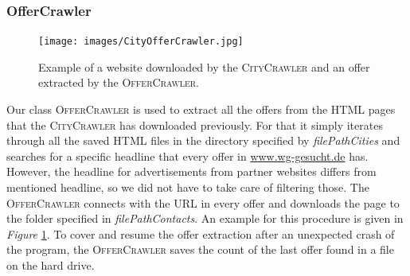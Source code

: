 \documentclass[11pt]{scrartcl}
\begin{document}
\subsubsection{OfferCrawler}
\begin{figure}
    \centering
    \texttt{[image: images/CityOfferCrawler.jpg]}
    \caption{Example of a website downloaded by the \textsc{CityCrawler} and an offer extracted by the \textsc{OfferCrawler}.}
    \label{fig:offer_site}
\end{figure}%
Our class \textsc{OfferCrawler} is used to extract all the offers from the HTML pages that the \textsc{CityCrawler} has downloaded previously. For that it simply iterates through all the saved HTML files in the directory specified by \textit{filePathCities} and searches for a specific headline that every offer in \url{www.wg-gesucht.de} has. However, the headline for advertisements from partner websites differs from mentioned headline, so we did not have to take care of filtering those. The \textsc{OfferCrawler} connects with the URL in every offer and downloads the page to the folder specified in \textit{filePathContacts}. An example for this procedure is given in \textit{Figure} \ref{fig:offer_site}. To cover and resume the offer extraction after an unexpected crash of the program, the \textsc{OfferCrawler} saves the count of the last offer found in a file on the hard drive.
\end{document}
